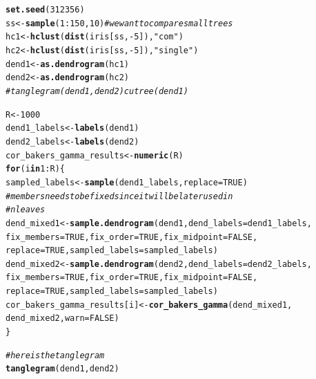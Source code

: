 \documentclass[shortnames,nojss,article]{jss}\usepackage[]{graphicx}\usepackage[]{color}
\makeatletter
\newcommand{\hlnum}[1]{\textcolor[rgb]{0.686,0.059,0.569}{#1}}%
\newcommand{\hlstr}[1]{\textcolor[rgb]{0.192,0.494,0.8}{#1}}%
\newcommand{\hlcom}[1]{\textcolor[rgb]{0.678,0.584,0.686}{\textit{#1}}}%
\newcommand{\hlopt}[1]{\textcolor[rgb]{0,0,0}{#1}}%
\newcommand{\hlstd}[1]{\textcolor[rgb]{0.345,0.345,0.345}{#1}}%
\newcommand{\hlkwa}[1]{\textcolor[rgb]{0.161,0.373,0.58}{\textbf{#1}}}%
\newcommand{\hlkwb}[1]{\textcolor[rgb]{0.69,0.353,0.396}{#1}}%
\newcommand{\hlkwc}[1]{\textcolor[rgb]{0.333,0.667,0.333}{#1}}%
\newcommand{\hlkwd}[1]{\textcolor[rgb]{0.737,0.353,0.396}{\textbf{#1}}}%
\newenvironment{kframe}{%
 \def\at@end@of@kframe{}%
 \ifinner\ifhmode%
  \def\at@end@of@kframe{\end{minipage}}%
  \begin{minipage}{\columnwidth}%
 \fi\fi%
 \def\FrameCommand##1{\hskip\@totalleftmargin \hskip-\fboxsep
 \colorbox{shadecolor}{##1}\hskip-\fboxsep
     \hskip-\linewidth \hskip-\@totalleftmargin \hskip\columnwidth}%
 \MakeFramed {\advance\hsize-\width
   \@totalleftmargin\z@ \linewidth\hsize
   \@setminipage}}%
 {\par\unskip\endMakeFramed%
 \at@end@of@kframe}
\newenvironment{knitrout}{}{} %
\makeatother
\begin{document}
\begin{knitrout}
\color{fgcolor}\begin{kframe}
\begin{alltt}
\hlkwd{set.seed}\hlstd{(}\hlnum{312356}\hlstd{)}
\hlstd{ss} \hlkwb{<-} \hlkwd{sample}\hlstd{(}\hlnum{1}\hlopt{:}\hlnum{150}\hlstd{,} \hlnum{10}\hlstd{)}  \hlcom{# we want to compare small trees}
\hlstd{hc1} \hlkwb{<-} \hlkwd{hclust}\hlstd{(}\hlkwd{dist}\hlstd{(iris[ss,} \hlopt{-}\hlnum{5}\hlstd{]),} \hlstr{"com"}\hlstd{)}
\hlstd{hc2} \hlkwb{<-} \hlkwd{hclust}\hlstd{(}\hlkwd{dist}\hlstd{(iris[ss,} \hlopt{-}\hlnum{5}\hlstd{]),} \hlstr{"single"}\hlstd{)}
\hlstd{dend1} \hlkwb{<-} \hlkwd{as.dendrogram}\hlstd{(hc1)}
\hlstd{dend2} \hlkwb{<-} \hlkwd{as.dendrogram}\hlstd{(hc2)}
\hlcom{# tanglegram(dend1, dend2) cutree(dend1)}

\hlstd{R} \hlkwb{<-} \hlnum{1000}
\hlstd{dend1_labels} \hlkwb{<-} \hlkwd{labels}\hlstd{(dend1)}
\hlstd{dend2_labels} \hlkwb{<-} \hlkwd{labels}\hlstd{(dend2)}
\hlstd{cor_bakers_gamma_results} \hlkwb{<-} \hlkwd{numeric}\hlstd{(R)}
\hlkwa{for} \hlstd{(i} \hlkwa{in} \hlnum{1}\hlopt{:}\hlstd{R) \{}
    \hlstd{sampled_labels} \hlkwb{<-} \hlkwd{sample}\hlstd{(dend1_labels,} \hlkwc{replace} \hlstd{=} \hlnum{TRUE}\hlstd{)}
    \hlcom{# members needs to be fixed since it will be later used in}
    \hlcom{# nleaves}
    \hlstd{dend_mixed1} \hlkwb{<-} \hlkwd{sample.dendrogram}\hlstd{(dend1,} \hlkwc{dend_labels} \hlstd{= dend1_labels,}
        \hlkwc{fix_members} \hlstd{=} \hlnum{TRUE}\hlstd{,} \hlkwc{fix_order} \hlstd{=} \hlnum{TRUE}\hlstd{,} \hlkwc{fix_midpoint} \hlstd{=} \hlnum{FALSE}\hlstd{,}
        \hlkwc{replace} \hlstd{=} \hlnum{TRUE}\hlstd{,} \hlkwc{sampled_labels} \hlstd{= sampled_labels)}
    \hlstd{dend_mixed2} \hlkwb{<-} \hlkwd{sample.dendrogram}\hlstd{(dend2,} \hlkwc{dend_labels} \hlstd{= dend2_labels,}
        \hlkwc{fix_members} \hlstd{=} \hlnum{TRUE}\hlstd{,} \hlkwc{fix_order} \hlstd{=} \hlnum{TRUE}\hlstd{,} \hlkwc{fix_midpoint} \hlstd{=} \hlnum{FALSE}\hlstd{,}
        \hlkwc{replace} \hlstd{=} \hlnum{TRUE}\hlstd{,} \hlkwc{sampled_labels} \hlstd{= sampled_labels)}
    \hlstd{cor_bakers_gamma_results[i]} \hlkwb{<-} \hlkwd{cor_bakers_gamma}\hlstd{(dend_mixed1,}
        \hlstd{dend_mixed2,} \hlkwc{warn} \hlstd{=} \hlnum{FALSE}\hlstd{)}
\hlstd{\}}


\hlcom{# here is the tanglegram}
\hlkwd{tanglegram}\hlstd{(dend1, dend2)}
\end{alltt}
\end{kframe}


\end{knitrout}
\end{document}
